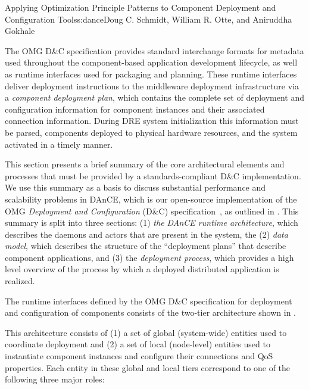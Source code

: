 \begin{aosachapter}{Applying Optimization Principle Patterns to Component Deployment and
                    Configuration Tools}{s:dance}{Doug C. Schmidt, William R. Otte, and Aniruddha Gokhale}

\label{sec.overview}

The OMG D\&C specification provides standard interchange formats for
metadata used throughout the component-based application development
lifecycle, as well as runtime interfaces used for packaging and
planning. These runtime interfaces deliver deployment instructions to
the middleware deployment infrastructure via a \emph{component
deployment plan}, which contains the complete set of deployment and
configuration information for component instances and their associated
connection information. During DRE system initialization this
information must be parsed, components deployed to physical hardware
resources, and the system activated in a timely manner.

This section presents a brief summary of the core architectural elements
and processes that must be provided by a standards-compliant D\&C
implementation. We use this summary as a basis to discuss substantial
performance and scalability problems in DAnCE, which is our open-source
implementation of the OMG \emph{Deployment and Configuration} (D\&C)
specification~\cite{DandC:06}, as outlined in . This
summary is split into three sections: (1) \emph{the DAnCE runtime
architecture}, which describes the daemons and actors that are present
in the system, the (2) \emph{data model}, which describes the structure
of the ``deployment plans'' that describe component applications, and
(3) the \emph{deployment process}, which provides a high level overview
of the process by which a deployed distributed application is realized.


\label{sec.overview.arch}

The runtime interfaces defined by the OMG D\&C specification for
deployment and configuration of components consists of the two-tier
architecture shown in .


This architecture consists of (1) a set of global (system-wide) entities
used to coordinate deployment and (2) a set of local (node-level)
entities used to instantiate component instances and configure their
connections and QoS properties. Each entity in these global and local
tiers correspond to one of the following three major roles:


\end{aosachapter}
